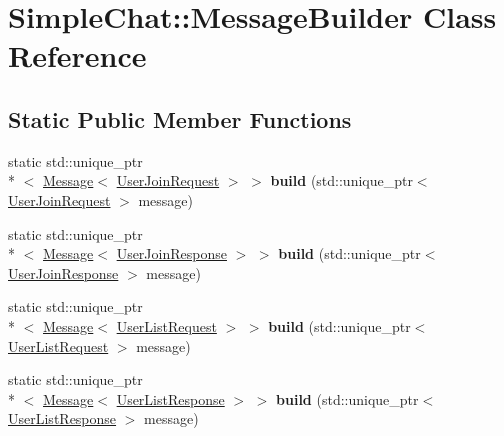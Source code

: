 \hypertarget{classSimpleChat_1_1MessageBuilder}{\section{Simple\-Chat\-:\-:Message\-Builder Class Reference}
\label{classSimpleChat_1_1MessageBuilder}
}
\subsection*{Static Public Member Functions}
\begin{DoxyCompactItemize}
\item 
\hypertarget{classSimpleChat_1_1MessageBuilder_a7dec768a4ac3206671a1e77b4516e6c3}{static std\-::unique\-\_\-ptr\\*
$<$ \hyperlink{classSimpleChat_1_1Message}{Message}$<$ \hyperlink{classSimpleChat_1_1UserJoinRequest}{User\-Join\-Request} $>$ $>$ {\bfseries build} (std\-::unique\-\_\-ptr$<$ \hyperlink{classSimpleChat_1_1UserJoinRequest}{User\-Join\-Request} $>$ message)}\label{classSimpleChat_1_1MessageBuilder_a7dec768a4ac3206671a1e77b4516e6c3}

\item 
\hypertarget{classSimpleChat_1_1MessageBuilder_ad0c528702aba9f95737341a313a5b7c8}{static std\-::unique\-\_\-ptr\\*
$<$ \hyperlink{classSimpleChat_1_1Message}{Message}$<$ \hyperlink{classSimpleChat_1_1UserJoinResponse}{User\-Join\-Response} $>$ $>$ {\bfseries build} (std\-::unique\-\_\-ptr$<$ \hyperlink{classSimpleChat_1_1UserJoinResponse}{User\-Join\-Response} $>$ message)}\label{classSimpleChat_1_1MessageBuilder_ad0c528702aba9f95737341a313a5b7c8}

\item 
\hypertarget{classSimpleChat_1_1MessageBuilder_a2f553e064aa865375bd7b3f7e1ff52cc}{static std\-::unique\-\_\-ptr\\*
$<$ \hyperlink{classSimpleChat_1_1Message}{Message}$<$ \hyperlink{classSimpleChat_1_1UserListRequest}{User\-List\-Request} $>$ $>$ {\bfseries build} (std\-::unique\-\_\-ptr$<$ \hyperlink{classSimpleChat_1_1UserListRequest}{User\-List\-Request} $>$ message)}\label{classSimpleChat_1_1MessageBuilder_a2f553e064aa865375bd7b3f7e1ff52cc}

\item 
\hypertarget{classSimpleChat_1_1MessageBuilder_ad9d4408866b2a8cf4a77bd2e5832686a}{static std\-::unique\-\_\-ptr\\*
$<$ \hyperlink{classSimpleChat_1_1Message}{Message}$<$ \hyperlink{classSimpleChat_1_1UserListResponse}{User\-List\-Response} $>$ $>$ {\bfseries build} (std\-::unique\-\_\-ptr$<$ \hyperlink{classSimpleChat_1_1UserListResponse}{User\-List\-Response} $>$ message)}\label{classSimpleChat_1_1MessageBuilder_ad9d4408866b2a8cf4a77bd2e5832686a}


\end{DoxyCompactItemize}
